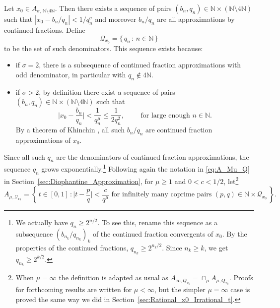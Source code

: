 \documentclass[11pt,reqno]{amsart}
\theoremstyle{definition}
\begin{document}
Let $x_0 \in A_{\sigma,  \, \mathbb N \setminus 4\mathbb N}$. 
Then there exists a sequence of pairs $(b_n, q_n) \in \mathbb N \times (\mathbb N \setminus 4\mathbb N)$ such that 
$|x_0 - b_n/q_n| < 1/q_n^\sigma$ and moreover
$b_n/q_n$ are all approximations by continued fractions. 
Define 
\begin{equation}
\mathcal Q_{x_0} = \{ \, q_n \, : \, n \in \mathbb N \,   \}
\end{equation} 
to be the set of such denominators. 
This sequence exists because:
\begin{itemize}
	\item if $\sigma = 2$, there is a subsequence of continued fraction approximations with odd denominator, in particular with $q_n \not\in 4\mathbb N$.  
	\item if $\sigma > 2$, by definition there exist a sequence of pairs $(b_n, q_n) \in \mathbb N \times (\mathbb N \setminus 4\mathbb N)$ such that 
	\begin{equation}
\Big| x_0 - \frac{b_n}{q_n} \Big| < \frac{1}{q_n^\mu} \leq \frac{1}{2q_n^2}, \qquad \text{ for large enough } n \in \mathbb N. 
\end{equation}
By a theorem of Khinchin \cite[Theorem 19]{Khinchin1964}, 
all such $b_n/q_n$ are continued fraction approximations of $x_0$. 
\end{itemize}
Since all such $q_n$ are the denominators of continued fraction approximations, 
the sequence $q_n$ grows exponentially.\footnote{We actually have $q_n \geq 2^{n/2}$. 
To see this, rename this sequence as a subsequence $(b_{n_k}/q_{n_k})_k$ of the continued fraction convergents of $x_0$. By the properties of the continued fractions, $q_{n_k} \geq 2^{n_k/2}$. Since $n_k \geq k$, we get $q_{n_k} \geq 2^{k/2}$. }
Following again the notation in \eqref{eq:A_Mu_Q}
in Section~\ref{sec:Diophantine_Approximation}, 
for $\mu \geq 1$ and $0 < c < 1/2$, let\footnote{
 When $\mu = \infty$ the definition is adapted as usual as $A_{\infty,Q_{x_0}} = \cap_\mu A_{\mu,Q_{x_0}}$.
 Proofs for forthcoming results are written for $\mu < \infty$, but the simpler $\mu = \infty$ case is proved the same way we did in Section~\ref{sec:Rational_x0_Irrational_t}.} 
\begin{equation}
A_{\mu,\mathcal Q_{x_0}} 
 = \left\{  \, t \in [0,1] \, : \Big| t - \frac{p}{q} \Big| < \frac{c}{q^\mu} \text{ for infinitely many coprime pairs  } (p,q) \in  \mathbb N \times \mathcal Q_{x_0} \,    \right\}.
\end{equation}
\end{document}
